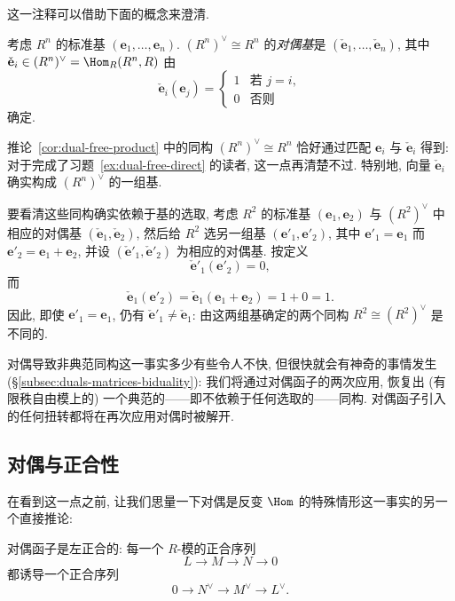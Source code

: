 这一注释可以借助下面的概念来澄清.

\begin{definition}\label{def:dual-basis}
考虑 $R^n$ 的标准基 $(\mathbf{e}_1,\dots,\mathbf{e}_n)$. $(R^n)^\vee\cong R^n$ 的\emph{对偶基}是 $(\check{\mathbf{e}}_1,\dots,\check{\mathbf{e}}_n)$, 其中 $\check{\mathbf{e}}_i\in(R^n)^\vee=\Hom_R(R^n,R)$ 由
\[
\check{\mathbf{e}}_i(\mathbf{e}_j)=
\begin{cases}
1 & \text{若 } j=i,\\
0 & \text{否则}
\end{cases}
\]
确定.
\end{definition}

推论~\ref{cor:dual-free-product} 中的同构 $(R^n)^\vee\cong R^n$ 恰好通过匹配 $\mathbf{e}_i$ 与 $\check{\mathbf{e}}_i$ 得到: 对于完成了习题~\ref{ex:dual-free-direct} 的读者, 这一点再清楚不过. 特别地, 向量 $\check{\mathbf{e}}_i$ 确实构成 $(R^n)^\vee$ 的一组基.

\begin{example}\label{ex:dual-basis-dependence}
要看清这些同构确实依赖于基的选取, 考虑 $R^2$ 的标准基 $(\mathbf{e}_1,\mathbf{e}_2)$ 与 $(R^2)^\vee$ 中相应的对偶基 $(\check{\mathbf{e}}_1,\check{\mathbf{e}}_2)$, 然后给 $R^2$ 选另一组基 $(\mathbf{e}'_1,\mathbf{e}'_2)$, 其中 $\mathbf{e}'_1=\mathbf{e}_1$ 而 $\mathbf{e}'_2=\mathbf{e}_1+\mathbf{e}_2$, 并设 $(\check{\mathbf{e}}'_1,\check{\mathbf{e}}'_2)$ 为相应的对偶基. 按定义
\[
\check{\mathbf{e}}'_1(\mathbf{e}'_2)=0,
\]
而
\[
\check{\mathbf{e}}_1(\mathbf{e}'_2)=\check{\mathbf{e}}_1(\mathbf{e}_1+\mathbf{e}_2)=1+0=1.
\]
因此, 即使 $\mathbf{e}'_1=\mathbf{e}_1$, 仍有 $\check{\mathbf{e}}'_1\neq\check{\mathbf{e}}_1$: 由这两组基确定的两个同构 $R^2\cong(R^2)^\vee$ 是不同的.
\end{example}

对偶导致非典范同构这一事实多少有些令人不快, 但很快就会有神奇的事情发生 (\S\ref{subsec:duals-matrices-biduality}): 我们将通过对偶函子的两次应用, 恢复出 (有限秩自由模上的) 一个典范的——即不依赖于任何选取的——同构. 对偶函子引入的任何扭转都将在再次应用对偶时被解开.

\subsection{对偶与正合性}\label{subsec:duality-exactness}

在看到这一点之前, 让我们思量一下对偶是反变 $\Hom$ 的特殊情形这一事实的另一个直接推论:

\begin{lemma}\label{lem:duality-left-exact}
对偶函子是左正合的: 每一个 $R$-模的正合序列
\[
L\longrightarrow M\longrightarrow N\longrightarrow 0
\]
都诱导一个正合序列
\[
0\longrightarrow N^\vee\longrightarrow M^\vee\longrightarrow L^\vee.
\]
\end{lemma}

